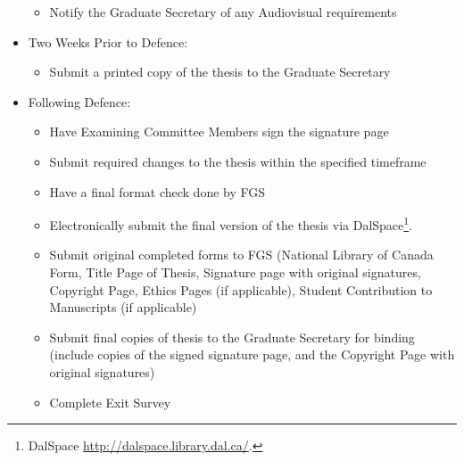 \documentclass{article}
\newcommand\elink[1]{\url{#1}}
\begin{document}
\begin{itemize}
\begin{itemize}
            \item Notify the Graduate Secretary of any Audiovisual requirements

        \end{itemize}

    \item Two Weeks Prior to Defence:
        
        \begin{itemize}

            \item Submit a printed copy of the thesis to the Graduate Secretary

        \end{itemize}


    \item Following Defence:

        \begin{itemize}

            \item Have Examining Committee Members sign the signature page

            \item Submit required changes to the thesis within the specified
                timeframe

            \item Have a final format check done by FGS

            \item Electronically submit the final version of the thesis via
                DalSpace\footnote{DalSpace
                \elink{http://dalspace.library.dal.ca/}.}.

            \item Submit original completed forms to FGS (National Library of
                Canada Form, Title Page of Thesis, Signature page with original
                signatures, Copyright Page, Ethics Pages (if applicable),
                Student Contribution to Manuscripts (if applicable)

            \item Submit final copies of thesis to the Graduate Secretary for
                binding (include copies of the signed signature page, and the
                Copyright Page with original signatures)

            \item Complete Exit Survey

        \end{itemize}

\end{itemize}
\end{document}
